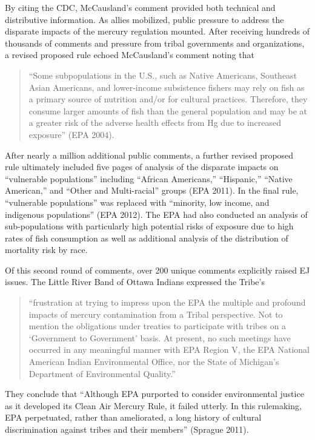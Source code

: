 \documentclass[
      12pt,
        ]{article}
\begin{document}
By citing the CDC, McCausland's comment provided both technical and distributive information. As allies mobilized, public pressure to address the disparate impacts of the mercury regulation mounted.
After receiving hundreds of thousands of comments and pressure from
tribal governments and organizations, a revised proposed rule echoed McCausland's
comment noting that

\begin{quote}
``Some subpopulations in the U.S., such as Native
Americans, Southeast Asian Americans, and lower-income subsistence
fishers may rely on fish as a primary source of nutrition and/or for
cultural practices. Therefore, they consume larger amounts of fish than
the general population and may be at a greater risk of the adverse
health effects from Hg due to increased exposure'' (EPA 2004).
\end{quote}

After nearly a million additional public comments, a further revised proposed
rule ultimately included five pages of analysis of the disparate impacts
on ``vulnerable populations'' including ``African Americans,'' ``Hispanic,''
``Native American,'' and ``Other and Multi-racial'' groups (EPA 2011). In the final rule, ``vulnerable populations'' was replaced
with ``minority, low income, and indigenous populations'' (EPA 2012). The EPA
had also conducted an analysis of sub-populations with particularly high
potential risks of exposure due to high rates of fish consumption as well
as additional analysis of the distribution of mortality risk by
race.

Of this second round of comments, over 200 unique comments explicitly raised
EJ issues. The Little River Band of Ottawa Indians
expressed the Tribe's

\begin{quote}
``frustration at trying to impress upon the EPA the
multiple and profound impacts of mercury contamination from a Tribal
perspective. Not to mention the obligations under treaties to
participate with tribes on a `Government to Government' basis. At
present, no such meetings have occurred in any meaningful manner with
EPA Region V, the EPA National American Indian Environmental Office, nor
the State of Michigan's Department of Environmental Quality.''
\end{quote}

They
conclude that ``Although EPA purported to consider environmental justice
as it developed its Clean Air Mercury Rule, it failed utterly. In this
rulemaking, EPA perpetuated, rather than ameliorated, a long history of
cultural discrimination against tribes and their members'' (Sprague
2011).
\end{document}
